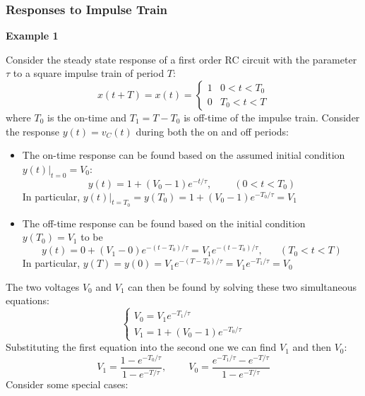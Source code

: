 \documentclass{article}
\begin{document}
\subsubsection*{Responses to Impulse Train}

{\bf Example 1}

Consider the steady state response of a first order RC circuit with the
parameter $\tau$ to a square impulse train of period $T$:
\begin{equation}
  x(t+T)=x(t)=\left\{ \begin{array}{cl}1&0<t<T_0\\0&T_0<t<T\end{array}\right.
\end{equation}
where $T_0$ is the on-time and $T_1=T-T_0$ is off-time of the impulse train.
Consider the response $y(t)=v_C(t)$ during both the on and off periods:
\begin{itemize}
\item The on-time response can be found based on the assumed initial condition 
  $y(t)\big|_{t=0}=V_0$:
  \begin{equation}
    y(t)=1+(V_0-1)e^{-t/\tau},\;\;\;\;\;\;\;\;(0<t<T_0) 
  \end{equation}
  In particular, $y(t)\big|_{t=T_0}=y(T_0)=1+(V_0-1)e^{-T_0/\tau}=V_1$  
\item The off-time response can be found based on the initial condition
  $y(T_0)=V_1$ to be
  \begin{equation} 
    y(t)=0+(V_1-0)e^{-(t-T_0)/\tau}=V_1 e^{-(t-T_0)/\tau},\;\;\;\;\;\;(T_0<t<T) 
  \end{equation}
  In particular, $y(T)=y(0)=V_1 e^{-(T-T_0)/\tau}=V_1 e^{-T_1/\tau}=V_0$
\end{itemize}
The two voltages $V_0$ and $V_1$ can then be found by solving these two 
simultaneous equations:
\begin{equation} 
  \left\{\begin{array}{l} V_0=V_1 e^{-T_1/\tau}\\V_1=1+(V_0-1)e^{-T_0/\tau}\end{array}\right. 
\end{equation}
Substituting the first equation into the second one we can find $V_1$ and then
$V_0$:
\begin{equation}
  V_1=\frac{1-e^{-T_0/\tau}}{1-e^{-T/\tau}},\;\;\;\;\;\;\;\;
  V_0=\frac{e^{-T_1/\tau}-e^{-T/\tau}}{1-e^{-T/\tau}} 
\end{equation}
Consider some special cases:
\end{document}
